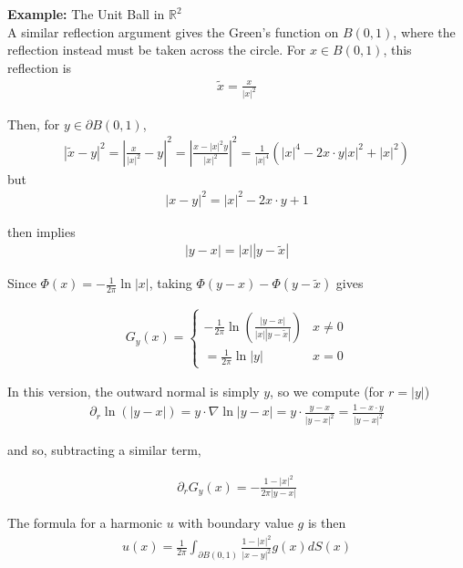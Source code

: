 \documentclass{article}
\newcommand{\R}{{\mathbb{R}}}
\newcommand{\pd}{\partial}
\begin{document}
	
	\vspace{1 cm}
	\textbf{Example:} The Unit Ball in $\R^{2}$ \\
	
	A similar reflection argument gives the Green's function on $B(0,1)$, where the reflection instead must be taken across the circle. For $x \in B(0,1)$, this reflection is 
	\begin{align*}
		\tilde{x} = \frac{x}{|x|^{2}}
	\end{align*}
	
	Then, for $y \in \pd B(0,1)$, 
	\begin{align*}
		|\tilde{x}-y|^{2} = |\frac{x}{|x|^{2}} - y|^{2} = | \frac{x-|x|^2 y}{|x|^{2}}|^{2} = \frac{1}{|x|^{4}}(|x|^{4}-2x \cdot y|x|^{2} +|x|^2)
	\end{align*}
	but 
	\begin{align*}
		|x-y|^{2} = |x|^{2} -2 x \cdot y +1
	\end{align*}
	
	then implies
	\begin{align*}
		|y-x| = |x| | y-\tilde{x}|
	\end{align*}
	
	Since $\Phi(x) = -\frac{1}{2\pi} \ln |x|$, taking $\Phi(y-x) - \Phi(y - \tilde{x})$ gives
	
	\begin{align*}
		G_{y}(x) = \begin{cases}
			-\frac{1}{2\pi} \ln \left( \frac{|y-x|}{|x||y-\tilde{x}|}\right) & x \neq 0 \\
			=\frac{1}{2\pi} \ln|y| & x=0
		\end{cases}
	\end{align*}
	
	In this version, the outward normal is simply $y$, so we compute (for $r = |y|$)
	\begin{align*}
		\pd_{r} \ln(|y-x|) = y \cdot \nabla \ln|y-x| = y \cdot \frac{y-x}{|y-x|^{2}} = \frac{1-x\cdot y}{|y-x|^{2}}
	\end{align*}
	
	and so, subtracting a similar term, 
	
	\begin{align*}
		\pd_{r} G_{y}(x) = -\frac{1-|x|^{2}}{2\pi|y-x|}
	\end{align*}
	
	The formula for a harmonic $u$ with boundary value $g$ is then
	\begin{align*}
		u(x) = \frac{1}{2\pi} \int_{\pd B(0,1)} \frac{1-|x|^{2}}{|x-y|^{2}}g(x)dS(x)
	\end{align*}
	
\end{document}
